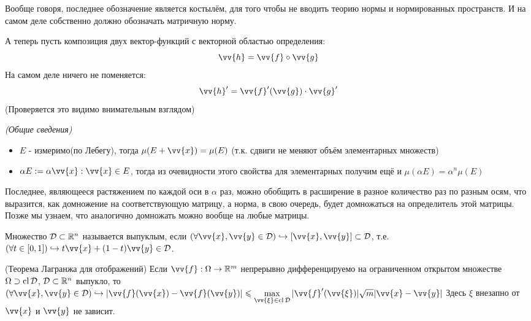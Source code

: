 \begin{note}
	Вообще говоря, последнее обозначение является костылём, для того чтобы не вводить теорию нормы и нормированных пространств. И на самом деле собственно должно обозначать матричную норму.
\end{note}

\begin{example}
	А теперь пусть композиция двух вектор-функций с векторной областью определения:
	\[
		\vv{h}=\vv{f}\circ\vv{g}
	\]
	На самом деле ничего не поменяется:
	\[
	\vv{h}'= \vv{f}'(\vv{g})\cdot \vv{g}'
	\]
	(Проверяется это видимо внимательным взглядом)
\end{example}

\begin{note}\textit{(Общие сведения)}
	\begin{itemize}
		\item $E$ - измеримо(по Лебегу), тогда $\mu(E+\vv{x})=\mu(E)$ (т.к. сдвиги не меняют объём элементарных множеств)
		\item $\alpha E:={\alpha \vv{x} : \vv{x}\in E}$, тогда из очевидности этого свойства для элементарных получим ещё и $\mu(\alpha E) = \alpha^n\mu(E)$
	\end{itemize}
\end{note}

\begin{note}
	Последнее, являющееся растяжением по каждой оси в $\alpha$ раз, можно обобщить в расширение в разное количество раз по разным осям, что выразится, как домножение на соответствующую матрицу, а норма, в свою очередь, будет домножаться на определитель этой матрицы. Позже мы узнаем, что аналогично домножать можно вообще на любые матрицы.
\end{note}

\begin{definition}
	Множество $\mathcal{D}\subset\mathbb{R}^n$ называется выпуклым, если $(\forall \vv{x}, \vv{y}\in \D)\emb[\vv{x}, \vv{y}]\subset\D$, т.е. $(\forall t\in[0, 1])\emb t\vv{x} + (1-t)\vv{y}\in\D$. 
\end{definition}

\begin{lemma}
	(Теорема Лагранжа для отображений) Если $\vv{f}:\Omega\to\R^m$ непрерывно дифференцируемо на ограниченном открытом множестве $\Omega\supset\operatorname{cl}{\mathcal{D}}$, $\mathcal{D}\subset\mathbb{R}^n$ выпукло, то $(\forall \vv{x}, \vv{y}\in\D)\emb |\vv{f}(\vv{x}) - \vv{f}(\vv{y})|\leq \max\limits_{\vv{\xi}\in\cl{\D}}{|\vv{f}'(\vv{\xi})|\sqrt{m}|\vv{x}-\vv{y}|}$ Здесь $\xi$ внезапно от $\vv{x}$ и $\vv{y}$ не зависит.
\end{lemma}

